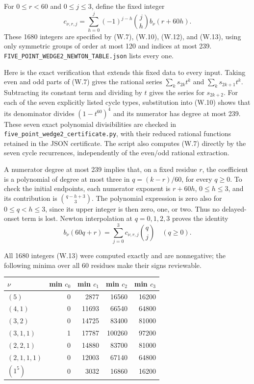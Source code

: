 \documentclass[
  10pt,
]{article}
\begin{document}
For \(0\le r<60\) and \(0\le j\le3\), define the fixed integer \[
c_{\nu,r,j}
=\sum_{h=0}^j(-1)^{j-h}\binom jh b_\nu(r+60h).
\tag{W.13}
\] These 1680 integers are specified by (W.7), (W.10), (W.12), and
(W.13), using only symmetric groups of order at most 120 and indices at
most 239.
\texttt{\small FIVE\_\allowbreak{}POINT\_\allowbreak{}WEDGE2\_\allowbreak{}NEWTON\_\allowbreak{}TABLE.json}
lists every one.

Here is the exact verification that extends this fixed data to every
input. Taking even and odd parts of (W.7) gives the rational series
\(\sum_ks_{2k}t^k\) and \(\sum_ks_{2k+1}t^k\). Subtracting its constant
term and dividing by \(t\) gives the series for \(s_{2k+2}\). For each
of the seven explicitly listed cycle types, substitution into (W.10)
shows that its denominator divides \((1-t^{60})^4\) and its numerator
has degree at most 239. These seven exact polynomial divisibilities are
checked in
\texttt{\small five\_\allowbreak{}point\_\allowbreak{}wedge2\_\allowbreak{}certificate.py},
with their reduced rational functions retained in the JSON certificate.
The script also computes (W.7) directly by the seven cycle recurrences,
independently of the even/odd rational extraction.

A numerator degree at most 239 implies that, on a fixed residue \(r\),
the coefficient is a polynomial of degree at most three in
\(q=(k-r)/60\), for every \(q\ge0\). To check the initial endpoints,
each numerator exponent is \(r+60h\), \(0\le h\le3\), and its
contribution is \(\binom{q-h+3}{3}\). The polynomial expression is zero
also for \(0\le q<h\le3\), since its upper integer is then zero, one, or
two. Thus no delayed-onset term is lost. Newton interpolation at
\(q=0,1,2,3\) proves the identity \[
\boxed{b_\nu(60q+r)=\sum_{j=0}^3 c_{\nu,r,j}\binom qj\quad(q\ge0).}
\tag{W.14}
\]

All 1680 integers (W.13) were computed exactly and are nonnegative; the
following minima over all 60 residues make their signs reviewable.

\begin{longtable}[]{@{}lrrrr@{}}
\toprule\noalign{}
\(\nu\) & min \(c_0\) & min \(c_1\) & min \(c_2\) & min \(c_3\) \\
\midrule\noalign{}
\endhead
\bottomrule\noalign{}
\endlastfoot
\((5)\) & 0 & 2877 & 16560 & 16200 \\
\((4,1)\) & 0 & 11693 & 66540 & 64800 \\
\((3,2)\) & 0 & 14725 & 83400 & 81000 \\
\((3,1,1)\) & 1 & 17787 & 100260 & 97200 \\
\((2,2,1)\) & 0 & 14880 & 83700 & 81000 \\
\((2,1,1,1)\) & 0 & 12003 & 67140 & 64800 \\
\((1^5)\) & 0 & 3032 & 16860 & 16200 \\
\end{longtable}
\end{document}

